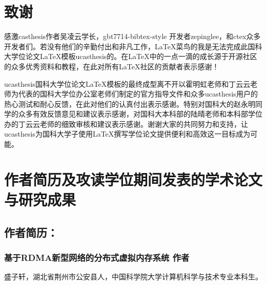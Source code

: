 \chapter[致谢]{致\quad 谢}%

感激casthesis作者吴凌云学长，gbt7714-bibtex-style
开发者zepinglee，和ctex众多开发者们。若没有他们的辛勤付出和非凡工作，\LaTeX{}菜鸟的我是无法完成此国科大学位论文\LaTeX{}模板ucasthesis的。在\LaTeX{}中的一点一滴的成长源于开源社区的众多优秀资料和教程，在此对所有\LaTeX{}社区的贡献者表示感谢！

ucasthesis国科大学位论文\LaTeX{}模板的最终成型离不开以霍明虹老师和丁云云老师为代表的国科大学位办公室老师们制定的官方指导文件和众多ucasthesis用户的热心测试和耐心反馈，在此对他们的认真付出表示感谢。特别对国科大的赵永明同学的众多有效反馈意见和建议表示感谢，对国科大本科部的陆晴老师和本科部学位办的丁云云老师的细致审核和建议表示感谢。谢谢大家的共同努力和支持，让ucasthesis为国科大学子使用\LaTeX{}撰写学位论文提供便利和高效这一目标成为可能。

\chapter{作者简历及攻读学位期间发表的学术论文与研究成果}


\section*{作者简历：}

\subsection*{基于RDMA新型网络的分布式虚拟内存系统 作者}

盛子轩，湖北省荆州市公安县人，中国科学院大学计算机科学与技术专业本科生。


